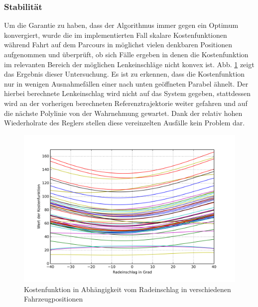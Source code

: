 \subsubsection{Stabilität}
Um die Garantie zu haben, dass der Algorithmus immer gegen ein Optimum konvergiert, wurde die im implementierten Fall skalare Kostenfunktionen während Fahrt auf dem Parcours in möglichst vielen denkbaren Positionen aufgenommen und überprüft, ob sich Fälle ergeben in denen die Kostenfunktion im relevanten Bereich der möglichen Lenkeinschläge nicht konvex ist. Abb. \ref{fig:parabel} zeigt das Ergebnis dieser Untersuchung. Es ist zu erkennen, dass die Kostenfunktion nur in wenigen Ausnahmefällen einer nach unten geöffneten Parabel ähnelt. Der hierbei berechnete Lenkeinschlag wird nicht auf das System gegeben, stattdessen wird an der vorherigen berechneten Referenztrajektorie weiter gefahren und auf die nächste Polylinie von der Wahrnehmung gewartet. Dank der relativ hohen Wiederholrate des Reglers stellen diese vereinzelten Ausfälle kein Problem dar.
\begin{figure}[t]
\centering
\includegraphics[scale=0.75]{Bilder/Parabeln.png}
\caption{Kostenfunktion in Abhängigkeit vom Radeinschlag in verschiedenen Fahrzeugpositionen}
\label{fig:parabel}
\end{figure}
